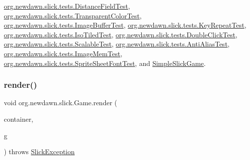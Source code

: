\mbox{\hyperlink{classorg_1_1newdawn_1_1slick_1_1tests_1_1_distance_field_test_a1179a4d943fc72536ec70f48b83d99fc}{org.\+newdawn.\+slick.\+tests.\+Distance\+Field\+Test}}, \mbox{\hyperlink{classorg_1_1newdawn_1_1slick_1_1tests_1_1_transparent_color_test_ab2d2d9ceff13edb0b85ba206691dda0b}{org.\+newdawn.\+slick.\+tests.\+Transparent\+Color\+Test}}, \mbox{\hyperlink{classorg_1_1newdawn_1_1slick_1_1tests_1_1_image_buffer_test_a3fef5aad2f8b60fd274af7d974f9583a}{org.\+newdawn.\+slick.\+tests.\+Image\+Buffer\+Test}}, \mbox{\hyperlink{classorg_1_1newdawn_1_1slick_1_1tests_1_1_key_repeat_test_a16457bc19cfcfd8d322b2fefc4e0799f}{org.\+newdawn.\+slick.\+tests.\+Key\+Repeat\+Test}}, \mbox{\hyperlink{classorg_1_1newdawn_1_1slick_1_1tests_1_1_iso_tiled_test_a8933b259f16c538ca712268d4254f24c}{org.\+newdawn.\+slick.\+tests.\+Iso\+Tiled\+Test}}, \mbox{\hyperlink{classorg_1_1newdawn_1_1slick_1_1tests_1_1_double_click_test_af05802df0ef6f5949a4c0d67c26947f0}{org.\+newdawn.\+slick.\+tests.\+Double\+Click\+Test}}, \mbox{\hyperlink{classorg_1_1newdawn_1_1slick_1_1tests_1_1_scalable_test_a99f4c97d1a23306b8313fbb32fd09451}{org.\+newdawn.\+slick.\+tests.\+Scalable\+Test}}, \mbox{\hyperlink{classorg_1_1newdawn_1_1slick_1_1tests_1_1_anti_alias_test_a1c6a933bba1b9045e6cc0aa1e2d6ae1e}{org.\+newdawn.\+slick.\+tests.\+Anti\+Alias\+Test}}, \mbox{\hyperlink{classorg_1_1newdawn_1_1slick_1_1tests_1_1_image_mem_test_ab1c711f13e9306b417fed9d190bf04f4}{org.\+newdawn.\+slick.\+tests.\+Image\+Mem\+Test}}, \mbox{\hyperlink{classorg_1_1newdawn_1_1slick_1_1tests_1_1_sprite_sheet_font_test_ac0db7d20128ed1f4d1a2363e37a44494}{org.\+newdawn.\+slick.\+tests.\+Sprite\+Sheet\+Font\+Test}}, and \mbox{\hyperlink{class_simple_slick_game_a2380b54e7768fd10b9959866dffc57ce}{Simple\+Slick\+Game}}.

\mbox{\label{interfaceorg_1_1newdawn_1_1slick_1_1_game_af1a4670d43eb3ba04dfcf55ab1975b64}} 
\subsubsection{\texorpdfstring{render()}{render()}}
{\footnotesize\ttfamily void org.\+newdawn.\+slick.\+Game.\+render (\begin{DoxyParamCaption}\item[{\mbox{\hyperlink{classorg_1_1newdawn_1_1slick_1_1_game_container}{Game\+Container}}}]{container,  }\item[{\mbox{\hyperlink{classorg_1_1newdawn_1_1slick_1_1_graphics}{Graphics}}}]{g }\end{DoxyParamCaption}) throws \mbox{\hyperlink{classorg_1_1newdawn_1_1slick_1_1_slick_exception}{Slick\+Exception}}}

